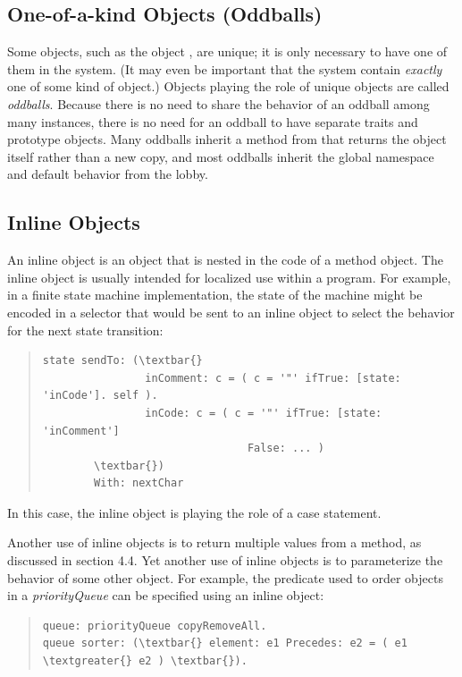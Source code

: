 \documentclass[letterpaper,10pt,english]{sphinxmanual}
\begin{document}
\subsection{One-of-a-kind Objects (Oddballs)}
\label{progguid:one-of-a-kind-objects-oddballs}
Some objects, such as the object , are unique; it is only necessary to have one of them in the
system. (It may even be important that the system contain \emph{exactly} one of some kind of object.) Objects
playing the role of unique objects are called \emph{oddballs}. Because there is no need to share the
behavior of an oddball among many instances, there is no need for an oddball to have separate
traits and prototype objects. Many oddballs inherit a  method from  that
returns the object itself rather than a new copy, and most oddballs inherit the global namespace and
default behavior from the lobby.


\subsection{Inline Objects}
\label{progguid:inline-objects}
An inline object is an object that is nested in the code of a method object. The inline object is usually
intended for localized use within a program. For example, in a finite state machine implementation,
the state of the machine might be encoded in a selector that would be sent to an inline object
to select the behavior for the next state transition:
\begin{quote}

\begin{Verbatim}[commandchars=\\\{\}]
state sendTo: (\textbar{}
                inComment: c = ( c = '"' ifTrue: [state: 'inCode']. self ).
                inCode: c = ( c = '"' ifTrue: [state: 'inComment']
                                False: ... )
        \textbar{})
        With: nextChar
\end{Verbatim}
\end{quote}

In this case, the inline object is playing the role of a case statement.

Another use of inline objects is to return multiple values from a method, as discussed in section
4.4. Yet another use of inline objects is to parameterize the behavior of some other object. For example,
the predicate used to order objects in a \emph{priorityQueue} can be specified using an inline
object:
\begin{quote}

\begin{Verbatim}[commandchars=\\\{\}]
queue: priorityQueue copyRemoveAll.
queue sorter: (\textbar{} element: e1 Precedes: e2 = ( e1 \textgreater{} e2 ) \textbar{}).
\end{Verbatim}
\end{quote}
\end{document}
